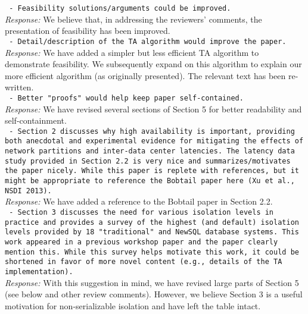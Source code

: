 \documentclass[10pt]{article}
\newcommand{\reviewer}[1] {\noindent\texttt{#1}\\}
\newcommand{\response}[1] {\noindent\textit{Response: } #1\\}
\begin{document}
\reviewer{ - Feasibility solutions/arguments could be improved. }

\response{We believe that, in addressing the reviewers' comments, the presentation of feasibility has been improved.}

\reviewer{ - Detail/description of the TA algorithm would improve the paper. }

\response{We have added a simpler but less efficient TA algorithm to demonstrate
feasibility. We subsequently expand on this algorithm to explain our
more efficient algorithm (as originally presented). The relevant text
has been re-written.}

\reviewer{ - Better "proofs" would help keep paper self-contained.}

\response{We have revised several sections of Section 5 for better readability
and self-containment.}

\reviewer{ - Section 2 discusses why high availability is important, providing both anecdotal and experimental evidence for mitigating the effects of network partitions and inter-data center latencies. The latency data study provided in Section 2.2 is very nice and summarizes/motivates the paper nicely. While this paper is replete with references, but it might be appropriate to reference the Bobtail paper here (Xu et al., NSDI 2013). }

\response{We have added a reference to the Bobtail paper in Section 2.2.}

\reviewer{ - Section 3 discusses the need for various isolation levels in practice and provides a survey of the highest (and default) isolation levels provided by 18 "traditional" and NewSQL database systems. This work appeared in a previous workshop paper and the paper clearly mention this. While this survey helps motivate this work, it could be shortened in favor of more novel content (e.g., details of the TA implementation). }

\response{With this suggestion in mind, we have revised large parts of Section 5
(see below and other review comments). However, we believe Section 3
is a useful motivation for non-serializable isolation and have left
the table intact.}
\end{document}
